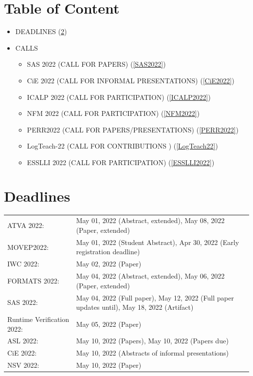 \documentclass[prodmode,acmtecs]{acmsmall} %
\begin{document}
\section{Table of Content}\begin{itemize}\item DEADLINES (\cref{deadlines}) 
 
\item CALLS 
 
\begin{itemize}\item SAS 2022 (CALL FOR PAPERS) (\cref{SAS2022})
\item CiE 2022 (CALL FOR INFORMAL PRESENTATIONS) (\cref{CiE2022})
\item ICALP 2022 (CALL FOR PARTICIPATION) (\cref{ICALP2022})
\item NFM 2022 (CALL FOR PARTICIPATION) (\cref{NFM2022})
\item PERR2022 (CALL FOR PAPERS/PRESENTATIONS) (\cref{PERR2022})
\item LogTeach-22 (CALL FOR CONTRIBUTIONS ) (\cref{LogTeach22})
\item ESSLLI 2022 (CALL FOR PARTICIPATION) (\cref{ESSLLI2022})
\end{itemize} 
\end{itemize}\section{Deadlines}\label{deadlines}\begin{tabulary}{\linewidth}{LL}ATVA 2022:  & May 01, 2022 (Abstract, extended), May 08, 2022 (Paper, extended) \\
MOVEP2022:  & May 01, 2022 (Student Abstract), Apr 30, 2022 (Early registration deadline) \\
IWC 2022:  & May 02, 2022 (Paper) \\
FORMATS 2022:  & May 04, 2022 (Abstract, extended), May 06, 2022 (Paper, extended) \\
SAS 2022:  & May 04, 2022 (Full paper), May 12, 2022 (Full paper updates until), May 18, 2022 (Artifact) \\
Runtime Verification 2022:  & May 05, 2022 (Paper) \\
ASL 2022:  & May 10, 2022 (Papers), May 10, 2022 (Papers due) \\
CiE 2022:  & May 10, 2022 (Abstracts of informal presentations) \\
NSV 2022:  & May 10, 2022 (Paper) \\

\end{tabulary}
\end{document}

